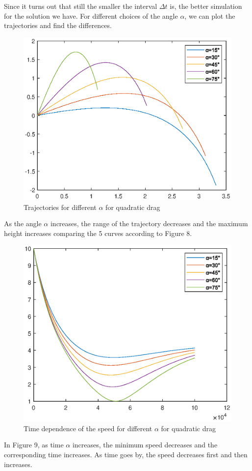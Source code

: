 \documentclass[12pt]{report}
\begin{document}
Since it turns out that still the smaller the interval $\Delta t$ is, the better simulation for the solution we have. For different choices of the angle $\alpha$, we can plot the trajectories and find the differences.
\begin{figure}[H]
    \centering
    \includegraphics[width=1\linewidth]{2-2-2.eps}
    \caption{Trajectories for different $\alpha$ for quadratic drag}
\end{figure}
As the angle $\alpha$ increases, the range of the trajectory decreases and the maximum height increases comparing the 5 curves according to Figure 8.
\begin{figure}[H]
    \centering
    \includegraphics[width=1\linewidth]{2-2-3.eps}
    \caption{Time dependence of the speed for different $\alpha$ for quadratic drag}
\end{figure}
In Figure 9, as time $\alpha$ increases, the minimum speed decreases and the corresponding time increases. As time goes by, the speed decreases first and then increases.
\end{document}
